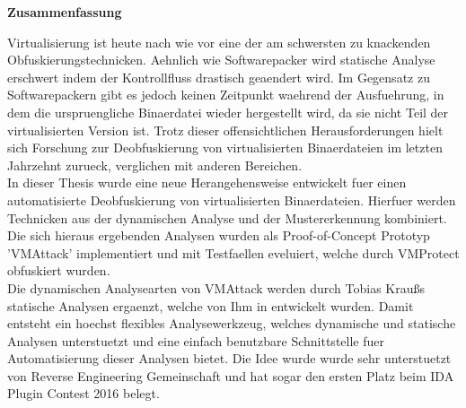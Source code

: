 \documentclass[10pt,twoside,a4paper,bibliography=totoc]{scrbook}
\makeatletter
\newcommand{\echoOther}[1]{Tobias Krau{\ss}}
\def\cleardoublepage{\clearpage\if@twoside \ifodd\c@page\else
  \hbox{}
  \thispagestyle{plain}
  \newpage
  \if@twocolumn\hbox{}\newpage\fi\fi\fi}
\makeatother
\begin{document}
\begin{center}
	\begin{large}
		\textbf{Zusammenfassung}
	\end{large}
\end{center}
\vspace{0.75em}
Virtualisierung ist heute nach wie vor eine der am schwersten zu knackenden Obfuskierungstechnicken. Aehnlich wie Softwarepacker wird statische Analyse erschwert indem der Kontrollfluss drastisch geaendert wird. Im Gegensatz zu Softwarepackern gibt es jedoch keinen Zeitpunkt waehrend der Ausfuehrung, in dem die urspruengliche Binaerdatei wieder hergestellt wird, da sie nicht Teil der virtualisierten Version ist. Trotz dieser offensichtlichen Herausforderungen hielt sich Forschung zur Deobfuskierung von virtualisierten Binaerdateien im letzten Jahrzehnt zurueck, verglichen mit anderen Bereichen.\\
In dieser Thesis wurde eine neue Herangehensweise entwickelt fuer einen automatisierte Deobfuskierung von virtualisierten Binaerdateien. Hierfuer werden Technicken aus der dynamischen Analyse und der Mustererkennung kombiniert. Die sich hieraus ergebenden Analysen wurden als Proof-of-Concept Prototyp 'VMAttack' implementiert und mit Testfaellen eveluiert, welche durch VMProtect obfuskiert wurden.\\
Die dynamischen Analysearten von VMAttack werden durch \echoOther{}s statische Analysen ergaenzt, welche von Ihm in \cite{Krau:Thesis2016} entwickelt wurden. Damit entsteht ein hoechst flexibles Analysewerkzeug, welches dynamische und statische Analysen unterstuetzt und eine einfach benutzbare Schnittstelle fuer Automatisierung dieser Analysen bietet. Die Idee wurde wurde sehr unterstuetzt von Reverse Engineering Gemeinschaft und hat sogar den ersten Platz beim IDA Plugin Contest 2016 belegt.




\listoftables
\listoffigures
\begin{onehalfspacing}
\tableofcontents
\end{onehalfspacing}
\cleardoublepage



\fancyhead[RE]{\leftmark}
%
% 
\end{document}
